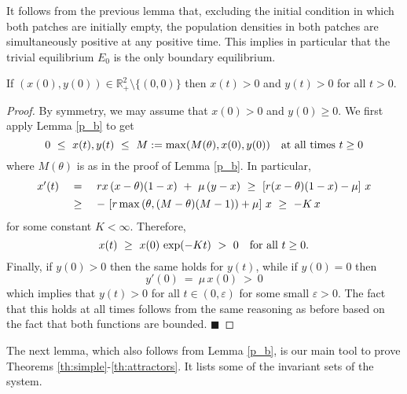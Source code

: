 \noindent It follows from the previous lemma that, excluding the initial condition in which both patches are initially empty,
 the population densities in both patches are simultaneously positive at any positive time.
 This implies in particular that the trivial equilibrium $E_0$ is the only boundary equilibrium.

\begin{lemma}
\label{c1}
 If $(x (0), y (0)) \in {{\mathbb{R}}}^2_+ \setminus \{(0,0) \}$ then $x (t) > 0$ and $y (t) > 0$ for all $t > 0$.
\end{lemma}
\begin{proof}
 By symmetry, we may assume that $x (0) > 0$ and $y (0) \geq 0$.
 We first apply Lemma \ref{p_b} to get
 $$ 0 \ \leq \ x (t), y (t) \ \leq \ M := \max (M (\theta), x (0), y (0)) \quad \hbox{at all times} \ t \geq 0 $$
 where $M (\theta)$ is as in the proof of Lemma \ref{p_b}.
 In particular,
 $$ \begin{array}{rcl}
     x' (t) \ & = & \ rx \,(x - \theta) (1 - x) \ + \ \mu \,(y - x) \ \geq \ [r (x - \theta) (1 - x) - \mu] \ x \vspace{4pt} \\
            \ & \geq & \ - \ [r \max \,(\theta, (M - \theta) (M - 1)) + \mu] \ x \ \geq \ - K \,x \end{array} $$
 for some constant $K < \infty$. Therefore,
 $$ x (t) \ \geq \ x (0) \,\exp (- K t) \ > \ 0 \quad \hbox{for all} \ t \geq 0. $$
 Finally, if $y (0) > 0$ then the same holds for $y (t)$, while if $y (0) = 0$ then
 $$ y' (0) \ = \ \mu \,x (0) \ > \ 0 $$
 which implies that $y (t) > 0$ for all $t \in (0, {\mbox{$\varepsilon$}})$ for some small ${\mbox{$\varepsilon$}} > 0$.
 The fact that this holds at all times follows from the same reasoning as before based on the fact that both functions
 are bounded. \hspace{2mm} $\blacksquare$
\end{proof}

\noindent The next lemma, which also follows from Lemma \ref{p_b}, is our main tool to
 prove Theorems \ref{th:simple}-\ref{th:attractors}.
 It lists some of the invariant sets of the system.

